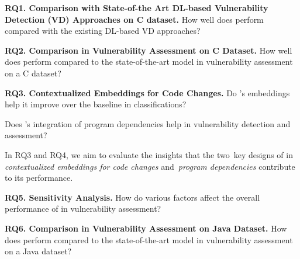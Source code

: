 

\vspace{1pt}
\noindent\textbf{RQ1. Comparison with State-of-the Art DL-based Vulnerability
Detection (VD) Approaches on C dataset.} How well does {\tool} perform
compared with the existing DL-based VD approaches?

\vspace{1pt}
\noindent\textbf{RQ2. Comparison in Vulnerability Assessment on C
  Dataset.} How well does {\tool} perform compared to the
state-of-the-art model in vulnerability assessment on a C dataset?


\noindent\textbf{RQ3. Contextualized Embeddings for Code Changes.} Do {\tool}'s embeddings help it improve over the
baseline in classifications?


 Does {\tool}'s integration
of program dependencies help in vulnerability detection and
assessment?

In RQ3 and RQ4, we aim to evaluate the insights that the two~key
  designs of {\tool} in {\em contextualized embeddings for code
  changes} and~{\em program dependencies} contribute to its performance.


\noindent\textbf{RQ5. Sensitivity Analysis.} How do various factors
affect the overall performance of {\tool} in vulnerability assessment?

\vspace{1pt}
\noindent\textbf{RQ6. Comparison in Vulnerability Assessment on Java
  Dataset.} How does {\tool} perform compared to the
state-of-the-art model in vulnerability assessment on a Java dataset?
